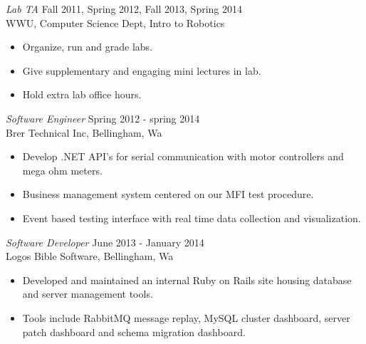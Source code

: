 \documentclass[line,margin]{res}
\begin{document}
\begin{resume}

                	{\sl Lab TA} \hfill        Fall 2011, Spring 2012, Fall 2013, Spring 2014 \\
                	WWU, Computer Science Dept, Intro to Robotics
                  	\begin{itemize}
                   		\item Organize, run and grade labs.
                   		\item Give supplementary and engaging mini lectures in lab.
			\item Hold extra lab office hours.  
                   	\end{itemize}

		{\sl Software Engineer} \hfill Spring 2012 - spring 2014 \\
                	Brer Technical Inc, Bellingham, Wa
                	\begin{itemize}  \itemsep -2pt
                		\item Develop .NET API's for serial communication with motor controllers and mega ohm meters.
                		\item Business management system centered on our MFI test procedure.
			\item Event based testing interface with real time data collection and visualization.  
               	 \end{itemize}
 
		{\sl Software Developer} \hfill June 2013 - January 2014 \\
                	Logos Bible Software, Bellingham, Wa
               	 \begin{itemize}  \itemsep -2pt
                		\item Developed and maintained an internal Ruby on Rails site housing database and server management tools. 
	     		\item Tools include RabbitMQ message replay, MySQL cluster dashboard, server patch dashboard and schema migration dashboard.
                	\end{itemize}


\end{resume}
\end{document}
